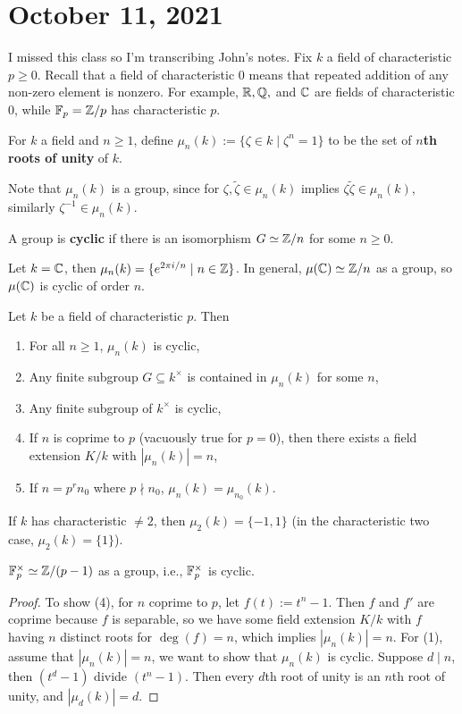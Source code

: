 \section{October 11, 2021} 
I missed this class so I'm transcribing John's notes. Fix $k$ a field of characteristic $p \geq 0$. Recall that a field of characteristic 0 means that repeated addition of any non-zero element is nonzero. For example, $\mathbb{R},\mathbb{Q},$ and $\mathbb{C}$ are fields of characteristic 0, while $\mathbb{F}_p = \mathbb{Z} /p$ has characteristic $p$. 
\begin{definition}[]
    For $k$ a field and $n \geq 1$, define $\mu _n (k) :=\{\zeta \in k \mid  \zeta ^n =1\} $ to be the set of $n$\textbf{th roots of unity} of $k$.
\end{definition}
Note that $\mu_n (k)$ is a group, since for $\zeta, \widetilde \zeta \in \mu _n (k)$ implies $\zeta \widetilde \zeta \in \mu_n (k)$, similarly $\zeta^{-1} \in \mu_n (k)$.
\begin{definition}[]
    A group is \textbf{cyclic} if there is an isomorphism $G \simeq  \mathbb{Z} /n$ for some $n \geq 0$.
\end{definition}
\begin{example}
    Let $k=\mathbb{C}$, then $\mu_n (k)= \{e^{2\pi i /n} \mid  n \in \mathbb{Z}\} $. In general, $\mu(\mathbb{C}) \simeq  \mathbb{Z} /n$ as a group, so $\mu(\mathbb{C})$ is cyclic of order $n$.
\end{example}
\begin{prop}\label{chark} 
    Let $k$ be a field of characteristic $p$. Then 
    \begin{enumerate}[label=(\arabic*)]
    \setlength\itemsep{-.2em}
\item For all $n\geq 1$, $\mu_n (k)$ is cyclic,
\item Any finite subgroup $G \subseteq k ^{\times }$ is contained in $\mu_n (k)$ for some $n$,
\item Any finite subgroup of $k ^{\times }$ is cyclic, 
\item If $n$ is coprime to $p$ (vacuously true for $p=0$), then there exists a field extension $K /k$ with $|\mu _n (k)|=n$,
\item If $n=p^r n_0$ where $p \nmid n_0$, $\mu_n (k)=\mu_{n_0}(k)$.
    \end{enumerate}
\end{prop}
\begin{example}
    If $k$ has characteristic $\neq 2$, then $\mu_2(k)= \{-1,1\} $ (in the characteristic two case, $\mu_2(k)=\{1\} $).
\end{example}
\begin{cor}
    $\mathbb{F}_p ^{\times }\simeq  \mathbb{Z} / (p-1)$ as a group, i.e., $\mathbb{F}_p ^{\times }$ is cyclic.
\end{cor}
\begin{proof}
    To show (4), for $n$ coprime to $p$, let $f(t):=t ^n -1$. Then  $f$ and $f'$ are coprime because $f$ is separable, so we have some field extension $K /k$ with $f$ having $n$ distinct roots for $\deg (f) =n$, which implies $|\mu_n (k)|=n$. For (1), assume that $|\mu _n (k)|=n$, we want to show that $\mu_n (k)$ is cyclic. Suppose $d \mid n$, then $(t^d -1)$ divide $(t ^n -1)$. Then every $d$th root of unity is an $n$th root of unity, and $|\mu_d(k)|=d$. 
\end{proof}
